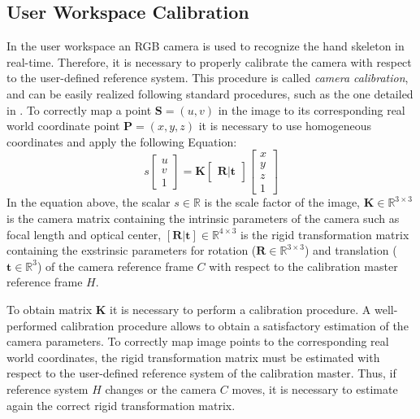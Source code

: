\documentclass[letterpaper, 10 pt, conference]{ieeeconf}  %
\begin{document}
\subsection{User Workspace Calibration}
In the user workspace an RGB camera is used to recognize the hand skeleton in real-time. Therefore, it is necessary to properly calibrate the camera with respect to the user-defined reference system. This procedure is called \textit{camera calibration}, and can be easily realized following standard procedures, such as the one detailed in \cite{MatlabCameraCalib}.
To correctly map a point $\mathbf{S} = (u,v)$ in the image to its corresponding real world coordinate point $\mathbf{P} = (x,y,z)$ it is necessary to use homogeneous coordinates and apply the following Equation:
\begin{equation}
s 
  \begin{bmatrix}
    u \\
    v \\
    1
  \end{bmatrix}
 =
\mathbf{K}
  \begin{bmatrix}
    \mathbf{R} | \mathbf{t}
  \end{bmatrix}
  \begin{bmatrix}
    x \\
    y \\
    z \\
    1
  \end{bmatrix}
\label{eq1}
\end{equation}
In the equation above, the scalar $s\in\mathbb{R}$ is the scale factor of the image, $\mathbf{K}\in\mathbb{R}^{3\times3}$ is the camera matrix containing the intrinsic parameters of the camera such as focal length and optical center, $\mathbf{[R|t]}\in\mathbb{R}^{4\times3}$ is the rigid transformation matrix containing the exstrinsic parameters for rotation ($\mathbf{R}\in\mathbb{R}^{3\times3}$) and translation ($\mathbf{t}\in\mathbb{R}^3$) of the camera reference frame $C$ with respect to the calibration master reference frame $H$.

To obtain matrix \textbf{K} it is necessary to perform a calibration procedure. A well-performed calibration procedure allows to obtain a satisfactory estimation of the camera parameters. To correctly map image points to the corresponding real world coordinates, the rigid transformation matrix must be estimated with respect to the user-defined reference system of the calibration master. Thus, if reference system $H$ changes or the camera $C$ moves, it is necessary to estimate again the correct rigid transformation matrix. %
\end{document}
